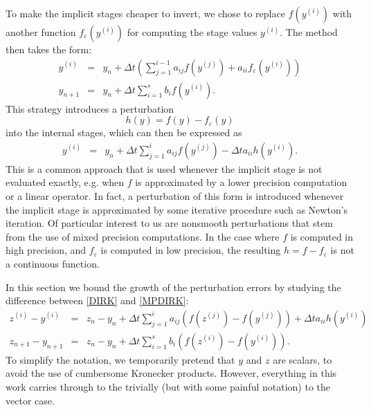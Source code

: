 \documentclass{siamart251104}
\newcommand{\dt}{\Delta t}
\begin{document}
To make the implicit stages cheaper to invert,
we  chose to replace $f(y^{(i)})$ with another function $f_{\varepsilon}(y^{(i)})$   for computing the stage values $ y^{(i)}$.
The method
then takes the form:
\begin{subequations} \label{MPDIRK}
\begin{eqnarray} 
    y^{(i)} & = & y_n + 
    \dt \left( \sum_{j=1}^{i-1} a_{ij} f(y^{(j)})
    + a_{ii} f_{\varepsilon}(y^{(i)}) \right) \\
    y_{n+1} & = & y_n + \dt \sum_{i=1}^s b_{i} f(y^{(i)}) .
\end{eqnarray}
\end{subequations}
This strategy introduces a perturbation
\[ h(y) = f(y) - f_{\varepsilon}(y) \]
into the internal stages, which can then be expressed as 
\begin{eqnarray} 
    y^{(i)}  & = & y_n + \dt \sum_{j=1}^{i} a_{ij} f(y^{(j)})
    - \dt a_{ii} h(y^{(i)}) .
\end{eqnarray}
This is a common approach that is used whenever the implicit 
stage is not evaluated exactly, e.g. 
when $f$ is approximated by a lower precision computation or a linear operator.
 In fact, a perturbation of this form is introduced  whenever the implicit stage 
 is approximated by  some iterative procedure such as  Newton's iteration. Of particular interest to us are
 nonsmooth perturbations that stem from the use
 of mixed precision computations. In the case where $f$
 is computed in high precision, and $f_\varepsilon$
 is computed in low precision, the resulting
 $h = f - f_\varepsilon$ is not a continuous function.

In this section we bound the growth of the perturbation
errors 
by studying the difference 
between  \eqref{DIRK} and \eqref{MPDIRK}: 
\begin{subequations} \label{errors}
\begin{eqnarray} 
 z^{(i)} -  y^{(i)} & = & z_n - y_n + \dt 
 \sum_{j=1}^{i} a_{ij}  \left( f(z^{(j)})  - f(y^{(j)}) \right) 
    + \dt a_{ii} h(y^{(i)})  \\
 z_{n+1} -   y_{n+1} & = & z_n - y_n + 
 \dt \sum_{i=1}^s b_{i} \left( f(z^{(i)})  - f(y^{(i)}) \right) .
\end{eqnarray}
\end{subequations}
To simplify the notation, we temporarily pretend that 
$y$ and $z$ are scalars,  to avoid 
the use of cumbersome Kronecker products. 
However, everything in this work carries through to the 
trivially (but with some painful notation) to the vector case. 
\end{document}
